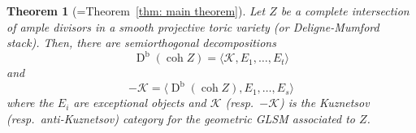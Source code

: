 \documentclass[reqno, 12pt]{amsart}
\newtheorem{theorem}{Theorem}[section]
\theoremstyle{definition}
\newcommand{\op}[1]{\operatorname{#1}}
\newcommand{\dbcoh}[1]{\operatorname{D}^{\operatorname{b}}(\operatorname{coh }#1)}
\newcommand{\dan}[1]{{\color{ForestGreen} \sf DK: [#1]}}
\def\Z{\op{\mathbb{Z}}}
\def\C{\op{\mathbb{C}}}
\numberwithin{equation}{section}
\begin{document}







\begin{theorem}[=Theorem~\ref{thm: main theorem}]\label{thm: intro thm 1}
Let $Z$ be a complete intersection of ample divisors in a smooth projective toric variety (or Deligne-Mumford stack).  Then, there are semiorthogonal decompositions
\begin{equation}\label{eq: intro kuz}
\dbcoh{Z} = \langle \mathcal K, E_1, \dots, E_t \rangle
\end{equation}
and
\begin{equation}\label{eq: intro antikuz}
-\mathcal K = \langle \dbcoh{Z}, E_1, \dots, E_s \rangle
\end{equation}
where the $E_i$ are exceptional objects and $\mathcal K$ (resp.\ $-\mathcal K$) is the Kuznetsov (resp.\ anti-Kuznetsov) category for the geometric GLSM associated to $Z$.
\end{theorem}
\end{document}
